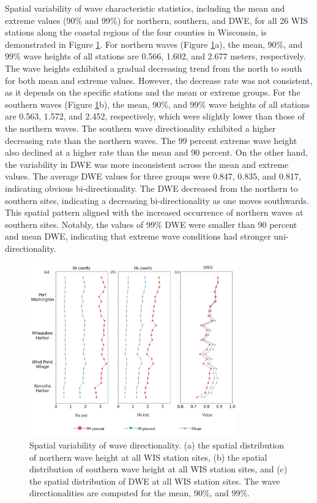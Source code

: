Spatial variability of wave characteristic statistics, including the mean and
extreme values (90\% and 99\%) for northern, southern, and DWE, for all 26 WIS
stations along the coastal regions of the four counties in Wisconsin, is
demonstrated in Figure \ref{fig:fig3.7}. For northern waves (Figure
\ref{fig:fig3.7}a), the mean, 90\%, and 99\% wave heights of all stations are
0.566, 1.602, and 2.677 meters, respectively. The wave heights exhibited a
gradual decreasing trend from the north to south for both mean and extreme
values. However, the decrease rate was not consistent, as it depends on the
specific stations and the mean or extreme groups. For the southern waves (Figure
\ref{fig:fig3.7}b), the mean, 90\%, and 99\% wave heights of all stations are
0.563, 1.572, and 2.452, respectively, which were slightly lower than those of
the northern waves. The southern wave directionality exhibited a higher
decreasing rate than the northern waves. The 99 percent extreme wave height also
declined at a higher rate than the mean and 90 percent. On the other hand, the
variability in DWE was more inconsistent across the mean and extreme values. The
average DWE values for three groups were 0.847, 0.835, and 0.817, indicating
obvious bi-directionality. The DWE decreased from the northern to southern
sites, indicating a decreasing bi-directionality as one moves southwards. This
spatial pattern aligned with the increased occurrence of northern waves at
southern sites. Notably, the values of 99\% DWE were smaller than 90 percent and
mean DWE, indicating that extreme wave conditions had stronger
uni-directionality. 

\begin{figure}[htbp]
  \centering
  \includegraphics[width=0.8\textwidth]{chapter3/resources/figure3-7.jpg}
  \caption{Spatial variability of wave directionality. (a) the spatial distribution of northern wave height at all WIS station sites, (b) the spatial distribution of southern wave height at all WIS station sites, and (c) the spatial distribution of DWE at all WIS station sites. The wave directionalities are computed for the mean, 90$\%$, and 99$\%$.}
  \label{fig:fig3.7}
\end{figure}

